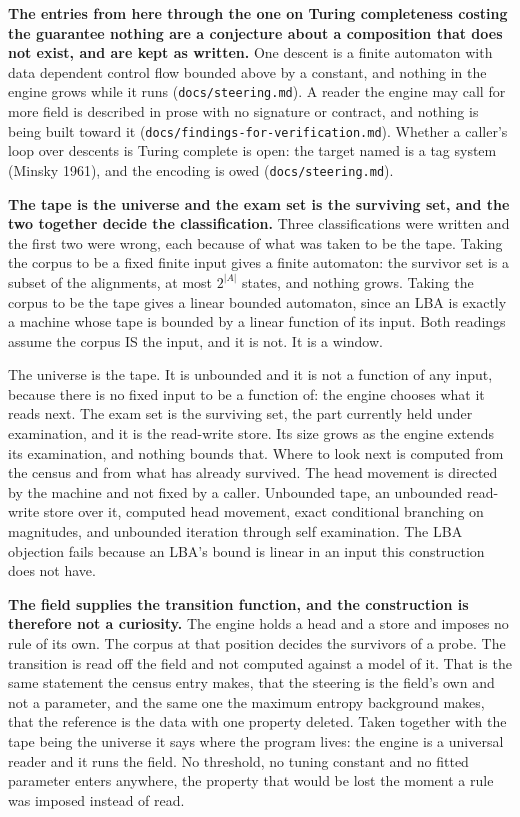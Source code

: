 \textbf{The entries from here through the one on Turing completeness costing the guarantee nothing are a conjecture about a composition that does not exist, and are kept as written.} One descent is a finite automaton with data dependent control flow bounded above by a constant, and nothing in the engine grows while it runs (\texttt{docs/\allowbreak{}steering.md}). A reader the engine may call for more field is described in prose with no signature or contract, and nothing is being built toward it (\texttt{docs/\allowbreak{}findings-\allowbreak{}for-\allowbreak{}verification.md}). Whether a caller's loop over descents is Turing complete is open: the target named is a tag system (Minsky 1961), and the encoding is owed (\texttt{docs/\allowbreak{}steering.md}).

\textbf{The tape is the universe and the exam set is the surviving set, and the two together decide the classification.} Three classifications were written and the first two were wrong, each because of what was taken to be the tape. Taking the corpus to be a fixed finite input gives a finite automaton: the survivor set is a subset of the alignments, at most \(2^{|A|}\) states, and nothing grows. Taking the corpus to be the tape gives a linear bounded automaton, since an LBA is exactly a machine whose tape is bounded by a linear function of its input. Both readings assume the corpus IS the input, and it is not. It is a window.

The universe is the tape. It is unbounded and it is not a function of any input, because there is no fixed input to be a function of: the engine chooses what it reads next. The exam set is the surviving set, the part currently held under examination, and it is the read-write store. Its size grows as the engine extends its examination, and nothing bounds that. Where to look next is computed from the census and from what has already survived. The head movement is directed by the machine and not fixed by a caller. Unbounded tape, an unbounded read-write store over it, computed head movement, exact conditional branching on magnitudes, and unbounded iteration through self examination. The LBA objection fails because an LBA's bound is linear in an input this construction does not have.

\textbf{The field supplies the transition function, and the construction is therefore not a curiosity.} The engine holds a head and a store and imposes no rule of its own. The corpus at that position decides the survivors of a probe. The transition is read off the field and not computed against a model of it. That is the same statement the census entry makes, that the steering is the field's own and not a parameter, and the same one the maximum entropy background makes, that the reference is the data with one property deleted. Taken together with the tape being the universe it says where the program lives: the engine is a universal reader and it runs the field. No threshold, no tuning constant and no fitted parameter enters anywhere, the property that would be lost the moment a rule was imposed instead of read.

